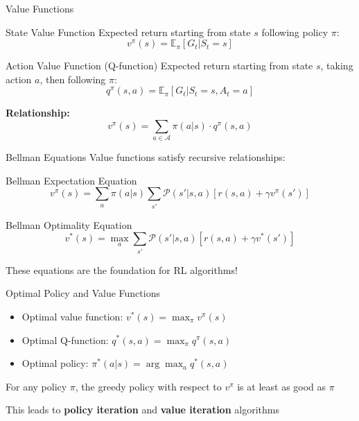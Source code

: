 \documentclass[aspectratio=169,10pt]{beamer}
\begin{document}
\begin{frame}{Value Functions}
\begin{block}{State Value Function}
Expected return starting from state $s$ following policy $\pi$:
$$v^{\pi}(s) = \mathbb{E}_{\pi}[G_t | S_t = s]$$
\end{block}

\begin{block}{Action Value Function (Q-function)}
Expected return starting from state $s$, taking action $a$, then following $\pi$:
$$q^{\pi}(s,a) = \mathbb{E}_{\pi}[G_t | S_t = s, A_t = a]$$
\end{block}

\textbf{Relationship:}
$$v^{\pi}(s) = \sum_{a \in \mathcal{A}} \pi(a|s) \cdot q^{\pi}(s,a)$$
\end{frame}

\begin{frame}{Bellman Equations}
Value functions satisfy recursive relationships:

\begin{block}{Bellman Expectation Equation}
$$v^{\pi}(s) = \sum_a \pi(a|s) \sum_{s'} \mathcal{P}(s'|s,a)[r(s,a) + \gamma v^{\pi}(s')]$$
\end{block}

\begin{block}{Bellman Optimality Equation}
$$v^*(s) = \max_a \sum_{s'} \mathcal{P}(s'|s,a)[r(s,a) + \gamma v^*(s')]$$
\end{block}

These equations are the foundation for RL algorithms!
\end{frame}

\begin{frame}{Optimal Policy and Value Functions}
\begin{itemize}
    \item Optimal value function: $v^*(s) = \max_{\pi} v^{\pi}(s)$
    \item Optimal Q-function: $q^*(s,a) = \max_{\pi} q^{\pi}(s,a)$
    \item Optimal policy: $\pi^*(a|s) = \arg\max_a q^*(s,a)$
\end{itemize}

\begin{theorem}
For any policy $\pi$, the greedy policy with respect to $v^{\pi}$ is at least as good as $\pi$
\end{theorem}

This leads to \textbf{policy iteration} and \textbf{value iteration} algorithms
\end{frame}
\end{document}
